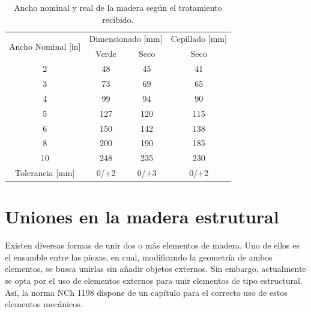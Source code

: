 \begin{table}[H]
\centering
\begin{tabular}{@{}cccc@{}}
\toprule
\multirow{2}{*}{Ancho Nominal {[}in{]}} & \multicolumn{2}{c}{Dimensionado {[}mm{]}} & Cepillado {[}mm{]} \\ \cmidrule(l){2-4} 
                                        & Verde                & Seco               & Seco               \\ \midrule
2                                       & 48                   & 45                 & 41                 \\
3                                       & 73                   & 69                 & 65                 \\
4                                       & 99                   & 94                 & 90                 \\
5                                       & 127                  & 120                & 115                \\
6                                       & 150                  & 142                & 138                \\
8                                       & 200                  & 190                & 185                \\
10                                      & 248                  & 235                & 230                \\ \midrule
Tolerancia {[}mm{]}                     & 0/+2                 & 0/+3               & 0/+2               \\ \bottomrule
\end{tabular}
\caption{Ancho nominal y real de la madera según el tratamiento recibido.}
\label{tab:anchodim}
\end{table}

\section{Uniones en la madera estrutural}
Existen diversas formas de unir dos o más elementos de madera. Uno de ellos es el ensamble entre las piezas, en cual, modificando la geometría de ambos elementos, se busca unirlas sin añadir objetos externos. Sin embargo, actualmente se opta por el uso de elementos externos para unir elementos de tipo estructural. Así, la norma NCh 1198 dispone de un capítulo para el correcto uso de estos elementos mecánicos.
